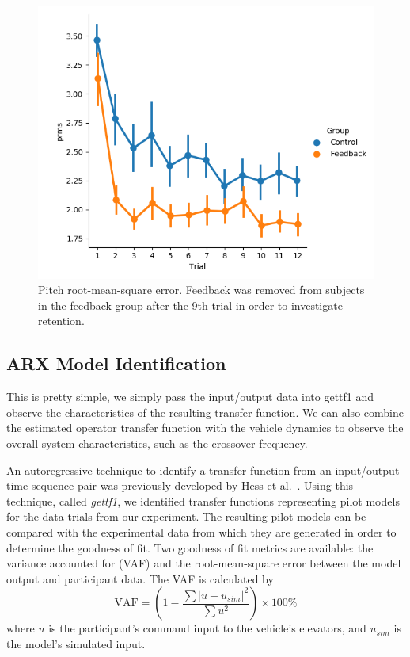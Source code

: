 \begin{figure}[t]
    \centering
    \includegraphics[width=0.8\linewidth]{figures/model_prms.png}
    \caption[Pitch root-mean-square error]{Pitch root-mean-square error. Feedback was removed from subjects in the feedback group after the 9th trial in order to investigate retention.}
    \label{fig:prmse}
\end{figure}

\subsection{ARX Model Identification}
This is pretty simple, we simply pass the input/output data into gettf1 and observe the characteristics of the resulting transfer function.
We can also combine the estimated operator transfer function with the vehicle dynamics to observe the overall system characteristics, such as the crossover frequency.

An autoregressive technique to identify a transfer function from an input/output time sequence pair was previously developed by Hess et al.~\cite{hess_modeling_2002}.
Using this technique, called \textit{gettf1}, we identified transfer functions representing pilot models for the data trials from our experiment.
The resulting pilot models can be compared with the experimental data from which they are generated in order to determine the goodness of fit.
Two goodness of fit metrics are available: the variance accounted for (VAF) and the root-mean-square error between the model output and participant data.
The VAF is calculated by
\begin{equation}
    \mbox{VAF} = \left( 1 - \dfrac{\sum{|u - u_{sim}|^2}} {\sum{u^2}} \right) \times \mbox{100\%}
\end{equation}
where $u$ is the participant's command input to the vehicle's elevators, and $u_{sim}$ is the model's simulated input.

